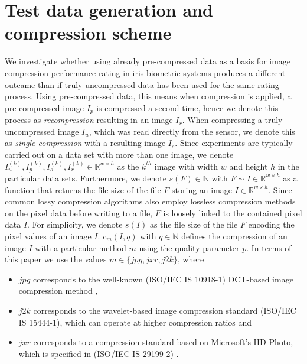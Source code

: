 \documentclass[10pt,twocolumn,letterpaper]{article}
\begin{document}
\section{Test data generation and compression scheme}
\label{section:comprScheme}
We investigate whether using already pre-compressed data as a basis for image compression performance rating in iris biometric systems produces a different outcame than if truly uncompressed data has been used for the same rating process. Using pre-compressed data, this means when compression is applied, a pre-compressed image $I_p$ is compressed a second time, hence we denote this process as \emph{recompression} resulting in an image $I_r$. When compressing a truly uncompressed image $I_u$, which was read directly from the sensor, we denote this as \emph{single-compression} with a resulting image $I_s$. Since experiments are typically carried out on a data set with more than one image, we denote $I_u^{(k)}, I_p^{(k)}, I_s^{(k)}, I_r^{(k)} \in \mathbb{R}^{w \times h}$ as the $k^{th}$ image with width $w$ and height $h$ in the particular data sets. Furthermore, we denote $s(F) \in \mathbb{N}$ with $F \sim{I \in \mathbb{R}^{w \times h}}$ as a function that returns the file size of the file $F$ storing an image $I \in \mathbb{R}^{w \times h} $. Since common lossy compression algorithms also employ lossless compression methods on the pixel data before writing to a file, $F$ is loosely linked to the contained pixel data $I$. For simplicity, we denote $s(I)$ as the file size of the file $F$ encoding the pixel values of an image $I$. $c_{m}(I, q)$ with $q \in \mathbb{N}$ defines the compression of an image $I$ with a particular method $m$ using the quality parameter $p$. In terms of this paper we use the values $m \in \{jpg, jxr, j2k\}$, where 
\begin{itemize}
	\item $jpg$ corresponds to the well-known (ISO/IEC IS 10918-1) DCT-based image compression method \cite{jpg},
	\item $j2k$ corresponds to the wavelet-based image compression standard (ISO/IEC IS 15444-1), which can operate at higher compression ratios \cite{j2k} and
	\item $jxr$ corresponds to a compression standard based on Microsoft’s HD Photo, which is specified in (ISO/IEC IS 29199-2) \cite{jxr}.  
\end{itemize}

\end{document}
